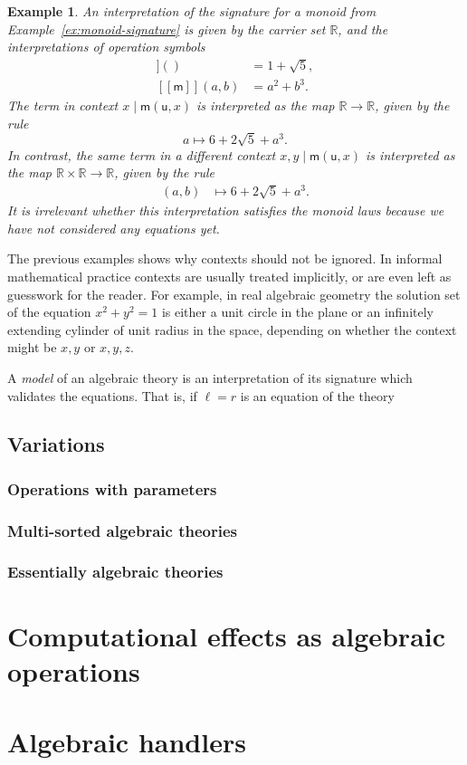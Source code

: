 \documentclass{amsart}
\newcommand{\RR}{\mathbb{R}}
\newcommand{\sem}[1]{[\![#1]\!]}
\newtheorem{example}[definition]{Example}
\begin{document}
\begin{example}
  An interpretation of the signature for a monoid from Example~\ref{ex:monoid-signature}
  is given by the carrier set $\RR$, and the interpretations of operation symbols
  \begin{align*}
    \sem{\mathsf{u}}() &= 1 + \sqrt{5}, \\
    \sem{\mathsf{m}}(a, b) &= a^2 + b^3.
  \end{align*}
  The term in context $x \mid \mathsf{m}(\mathsf{u}, x)$ is interpreted as the map
  $\RR \to \RR$, given by the rule
  \begin{equation*}
    a \mapsto 6 + 2 \sqrt{5} + a^3.
  \end{equation*}
  In contrast, the same term in a different context $x, y \mid \mathsf{m}(\mathsf{u}, x)$
  is interpreted as the map $\RR \times \RR \to \RR$, given by the rule
  \begin{align*}
    (a, b) &\mapsto 6 + 2 \sqrt{5} + a^3.
  \end{align*}
  It is irrelevant whether this interpretation satisfies the monoid laws because we have
  not considered any equations yet.
\end{example}

The previous examples shows why contexts should not be ignored. In informal mathematical
practice contexts are usually treated implicitly, or are even left as guesswork for the
reader. For example, in real algebraic geometry the solution set of the equation
$x^2 + y^2 = 1$ is either a unit circle in the plane or an infinitely extending cylinder
of unit radius in the space, depending on whether the context might be $x, y$ or
$x, y, z$.

A \emph{model} of an algebraic theory is an interpretation of its signature which
validates the equations. That is, if $\ell = r$ is an equation of the theory




\subsection{Variations}
\label{sec:variations}

\subsubsection{Operations with parameters}
\label{sec:oper-with-param}

\subsubsection{Multi-sorted algebraic theories}
\label{sec:multi-sort-algebr}

\subsubsection{Essentially algebraic theories}
\label{sec:essent-algebr-theor}



\section{Computational effects as algebraic operations}
\label{sec:comp-effects-as}

\section{Algebraic handlers}
\label{sec:algebraic-handlers}
\end{document}
